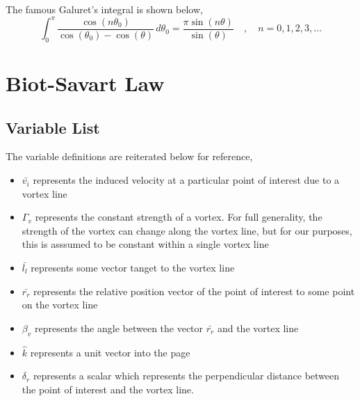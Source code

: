 \documentclass[a4paper, 12pt]{report}
\begin{document}
\tableofcontents

\begin{center}



The famous Galuret's integral is shown below,
\begin{equation}
\int^{\pi}_{0} \frac{\cos(n\theta_{0})}{\cos(\theta_{0}) - \cos(\theta)} \,d\theta_{0} = \frac{\pi \sin(n\theta)}{\sin(\theta)} \quad,\quad n = 0,1,2,3,\dots
\label{Galuret's Integral}
\end{equation}


\section{Biot-Savart Law}
\begin{comment}
Haven't added various images

\end{comment}

\subsection{Variable List}
\begin{comment}
\end{comment}
The variable definitions are reiterated below for reference,
\begin{itemize}
\item $\bar{v_{i}}$ represents the induced velocity at a particular point of interest due to a vortex line
\item $\Gamma_{v}$ represents the constant strength of a vortex. For full generality, the strength of the vortex can change along the vortex line, but for our purposes, this is asssumed to be constant within a single vortex line
\item $\bar{l_{l}}$ represents some vector tanget to the vortex line
\item $\bar{r_{r}}$ represents the relative position vector of the point of interest to some point on the vortex line
\item $\beta_{v}$ represents the angle between the vector $\bar{r_{r}}$ and the vortex line
\item $\hat{k}$ represents a unit vector into the page
\item $\delta_{r}$ represents a scalar which represents the perpendicular distance between the point of interest and the vortex line.
\end{itemize}


\end{center}
\end{document}
